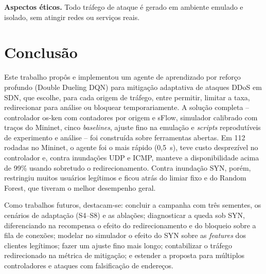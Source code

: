 \documentclass[12pt]{article}
\begin{document}
\textbf{Aspectos éticos.} Todo tráfego de ataque é gerado em ambiente
emulado e isolado, sem atingir redes ou serviços reais.

\section{Conclusão}\label{sec:conclusao}

Este trabalho propôs e implementou um agente de aprendizado por reforço
profundo (Double Dueling DQN) para mitigação adaptativa de ataques DDoS em SDN,
que escolhe, para cada origem de tráfego, entre permitir, limitar a taxa,
redirecionar para análise ou bloquear temporariamente. A solução completa --
controlador os-ken com contadores por origem e sFlow, simulador calibrado com
traços do Mininet, cinco \textit{baselines}, ajuste fino na emulação e
\textit{scripts} reprodutíveis de experimento e análise -- foi construída sobre
ferramentas abertas. Em 112 rodadas no Mininet, o agente foi o mais rápido
(0,5~s), teve custo desprezível no controlador e, contra inundações UDP e ICMP,
manteve a disponibilidade acima de 99\% usando sobretudo o redirecionamento.
Contra inundação SYN, porém, restringiu muitos usuários legítimos e ficou
atrás do limiar fixo e do Random Forest, que tiveram o melhor desempenho geral.

Como trabalhos futuros, destacam-se: concluir a campanha com três sementes, os
cenários de adaptação (S4--S8) e as ablações; diagnosticar a queda sob SYN,
diferenciando na recompensa o efeito do redirecionamento e do bloqueio sobre
a fila de conexões; modelar no simulador o efeito do SYN sobre as
\textit{features} dos clientes legítimos; fazer um ajuste fino mais longo;
contabilizar o tráfego redirecionado na métrica de mitigação; e estender a
proposta para múltiplos controladores e ataques com falsificação de endereços.



\end{document}
